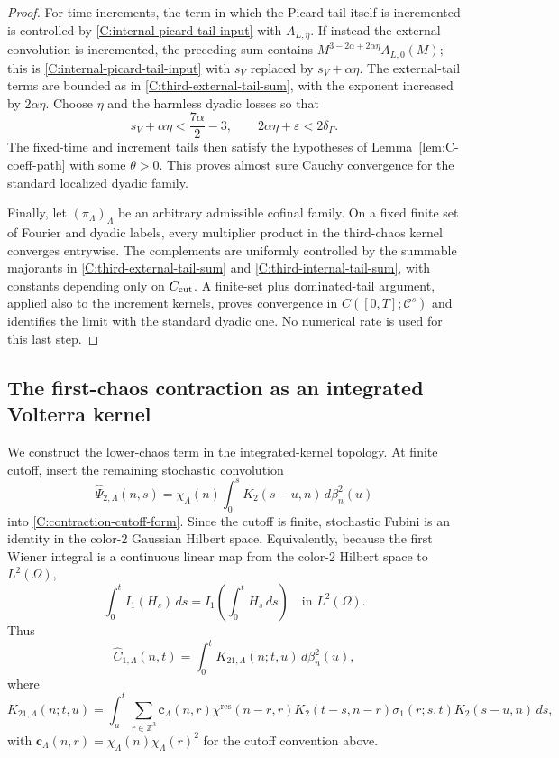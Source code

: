 \documentclass[10pt]{amsart}
\numberwithin{equation}{section}
\theoremstyle{plain}
\theoremstyle{definition}
\theoremstyle{remark}
\newcommand{\Z}{\mathbb{Z}}
\newcommand{\C}{\mathcal{C}}
\newcommand{\eps}{\varepsilon}
\newcommand{\wh}{\widehat}
\begin{document}
\begin{proof}
For time increments, the term in which the Picard tail itself is incremented is controlled by \eqref{C:internal-picard-tail-input} with \(A_{L,\eta}\).  If instead the external convolution is incremented, the preceding sum contains
\(
M^{3-2\alpha+2\alpha\eta}A_{L,0}(M)
\);
this is \eqref{C:internal-picard-tail-input} with \(s_V\) replaced by \(s_V+\alpha\eta\).  The external-tail terms are bounded as in \eqref{C:third-external-tail-sum}, with the exponent increased by \(2\alpha\eta\).  Choose \(\eta\) and the harmless dyadic losses so that
\[
        s_V+\alpha\eta<\frac{7\alpha}{2}-3,
        \qquad
        2\alpha\eta+\eps<2\delta_\Gamma.
\]
The fixed-time and increment tails then satisfy the hypotheses of Lemma~\ref{lem:C-coeff-path} with some \(\theta>0\).  This proves almost sure Cauchy convergence for the standard localized dyadic family.

Finally, let \((\pi_\Lambda)_\Lambda\) be an arbitrary admissible cofinal family.  On a fixed finite set of Fourier and dyadic labels, every multiplier product in the third-chaos kernel converges entrywise.  The complements are uniformly controlled by the summable majorants in \eqref{C:third-external-tail-sum} and \eqref{C:third-internal-tail-sum}, with constants depending only on \(C_{\rm cut}\).  A finite-set plus dominated-tail argument, applied also to the increment kernels, proves convergence in \(C([0,T];\C^s)\) and identifies the limit with the standard dyadic one.  No numerical rate is used for this last step.
\end{proof}

\subsection{The first-chaos contraction as an integrated Volterra kernel}\label{subsec:C-first-chaos-integrated}

We construct the lower-chaos term in the integrated-kernel topology.  At finite cutoff, insert the remaining stochastic convolution
\[
        \wh\Psi_{2,\Lambda}(n,s)
        =\chi_\Lambda(n)\int_0^s K_2(s-u,n)\,d\beta^2_n(u)
\]
into \eqref{C:contraction-cutoff-form}.  Since the cutoff is finite, stochastic Fubini is an identity in the color-2 Gaussian Hilbert space.  Equivalently, because the first Wiener integral is a continuous linear map from the color-2 Hilbert space to \(L^2(\Omega)\),
\[
        \int_0^t I_1(H_s)\,ds
        =I_1\left(\int_0^tH_s\,ds\right)
        \quad\text{in }L^2(\Omega).
\]
Thus
\begin{equation}\label{C:C-Lambda-integrated}
        \wh C_{1,\Lambda}(n,t)
        =\int_0^t K_{21,\Lambda}(n;t,u)\,d\beta_n^2(u),
\end{equation}
where
\begin{equation}\label{C:K21-Lambda}
        K_{21,\Lambda}(n;t,u)
        =\int_u^t
        \sum_{r\in\Z^3}
        \mathbf c_\Lambda(n,r)
        \chi^{\mathrm{res}}(n-r,r)
        K_2(t-s,n-r)\sigma_1(r;s,t)K_2(s-u,n)\,ds,
\end{equation}
with \(\mathbf c_\Lambda(n,r)=\chi_\Lambda(n)\chi_\Lambda(r)^2\) for the cutoff convention above.
\end{document}
